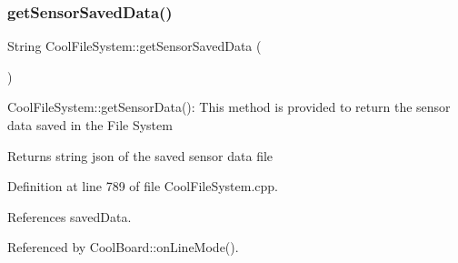 \subsubsection{\texorpdfstring{get\+Sensor\+Saved\+Data()}{getSensorSavedData()}}
{\footnotesize\ttfamily String Cool\+File\+System\+::get\+Sensor\+Saved\+Data (\begin{DoxyParamCaption}{ }\end{DoxyParamCaption})}

Cool\+File\+System\+::get\+Sensor\+Data()\+: This method is provided to return the sensor data saved in the File System

\begin{DoxyReturn}{Returns}
string json of the saved sensor data file 
\end{DoxyReturn}


Definition at line 789 of file Cool\+File\+System.\+cpp.



References saved\+Data.



Referenced by Cool\+Board\+::on\+Line\+Mode().


